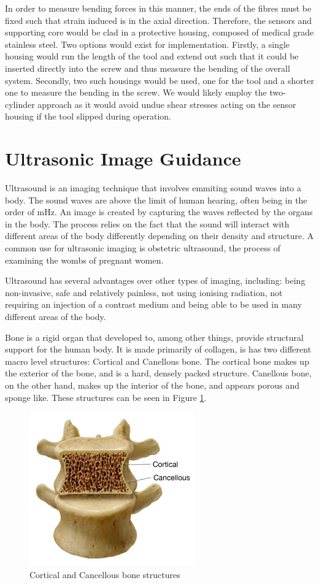 \documentclass[conference, a4paper]{IEEEtran}
\begin{document}
In order to measure bending forces in this manner, the ends of the fibres must be fixed such that strain induced
is in the axial direction. Therefore, the sensors and supporting core would be clad in a protective housing,
composed of medical grade stainless steel. Two options would exist for implementation. Firstly, a single
housing would run the length of the tool and extend out such that it could be inserted directly into the screw and
thus measure the bending of the overall system. Secondly, two such housings would be used, one for the tool
and a shorter one to measure the bending in the screw. We would likely employ the two-cylinder approach as it
would avoid undue shear stresses acting on the sensor housing if the tool slipped during operation.


\section{Ultrasonic Image Guidance}
Ultrasound is an imaging technique that involves emmiting sound waves into a
body. The sound waves are above the limit of human hearing, often being in
the order of mHz. An image is created by capturing the waves reflected
by the organs in the body. 
The process relies on the fact that the sound will interact with
different areas of the body differently depending on their density and
structure\cite{ultraHist}. A common use for ultrasonic imaging is obstetric ultrasound,
the process of examining the wombs of pregnant women. 

Ultrasound has several advantages over other types of imaging, including:
being non-invasive, safe and relatively painless, not using ionising radiation,
not requiring an injection of a contrast medium and being able to be used in
many different areas of the body\cite{imagingExplained}. 

Bone is a rigid organ that developed to, among other things, 
provide structural support for the human body. It is made primarily of
collagen, is has two different macro level structures: Cortical and Canellous 
bone. The cortical bone makes up the exterior of the bone, and is a hard, 
densely packed structure. Canellous bone, on the other hand, makes up the
interior of the bone, and appears porous and sponge like. These structures
can be seen in Figure \ref{fig:boneStruct}.

\begin{figure}
	\centering
	\includegraphics{assets/boneStruct.jpg}
	\caption{Cortical and Cancellous bone structures \cite{boneStructure}}
	\label{fig:boneStruct}
\end{figure}
\end{document}
